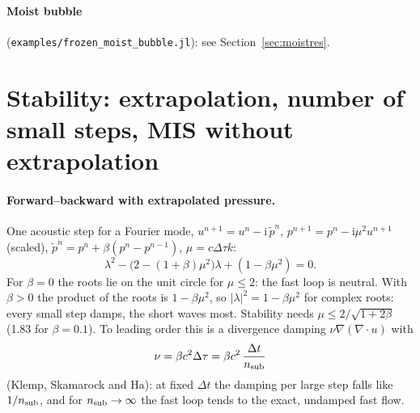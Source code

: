 \documentclass[11pt,a4paper]{article}
\newcommand{\code}[1]{\texttt{#1}}
\newcommand{\dt}{\Delta t}
\begin{document}
\paragraph{Moist bubble} (\code{examples/frozen\_moist\_bubble.jl}): see Section~\ref{sec:moistres}.

\section{Stability: extrapolation, number of small steps, MIS without extrapolation}\label{sec:stab}

\paragraph{Forward--backward with extrapolated pressure.} One acoustic step for a Fourier mode,
$u^{n+1}=u^n-\mathrm i\,\tilde p^n$, $p^{n+1}=p^n-\mathrm i\mu^2u^{n+1}$ (scaled), $\tilde p^n=p^n+\beta(p^n-p^{n-1})$,
$\mu=c\Delta\tau k$:
\[
\lambda^2-\big(2-(1+\beta)\mu^2\big)\lambda+(1-\beta\mu^2)=0 .
\]
For $\beta=0$ the roots lie on the unit circle for $\mu\le2$: the fast loop is neutral. With
$\beta>0$ the product of the roots is $1-\beta\mu^2$, so $|\lambda|^2=1-\beta\mu^2$ for complex roots:
every small step damps, the short waves most. Stability needs $\mu\le2/\sqrt{1+2\beta}$ (1.83 for
$\beta=0.1$). To leading order this is a divergence damping $\nu\nabla(\nabla\cdot u)$ with
\[
\nu=\beta c^2\Delta\tau=\beta c^2\,\frac{\dt}{n_{\rm sub}}
\]
(Klemp, Skamarock and Ha): at fixed $\dt$ the damping per large step falls like $1/n_{\rm sub}$, and for
$n_{\rm sub}\to\infty$ the fast loop tends to the exact, undamped fast flow.
\end{document}
